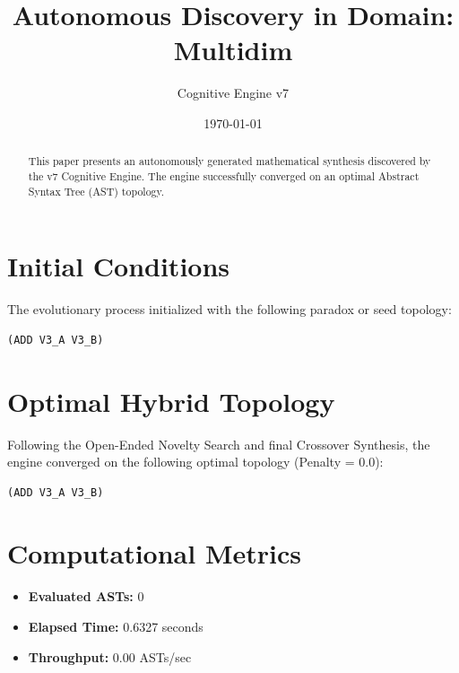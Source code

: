 \documentclass{article}
\title{Autonomous Discovery in Domain: Multidim}
\author{Cognitive Engine v7}
\date{\today}
\begin{document}
\maketitle
\begin{abstract}
This paper presents an autonomously generated mathematical synthesis discovered by the v7 Cognitive Engine. The engine successfully converged on an optimal Abstract Syntax Tree (AST) topology.\end{abstract}
\section{Initial Conditions}
The evolutionary process initialized with the following paradox or seed topology:
\begin{verbatim}
(ADD V3_A V3_B)
\end{verbatim}
\section{Optimal Hybrid Topology}
Following the Open-Ended Novelty Search and final Crossover Synthesis, the engine converged on the following optimal topology (Penalty = 0.0):
\begin{verbatim}
(ADD V3_A V3_B)
\end{verbatim}
\section{Computational Metrics}
\begin{itemize}
  \item \textbf{Evaluated ASTs:} 0
  \item \textbf{Elapsed Time:} 0.6327 seconds
  \item \textbf{Throughput:} 0.00 ASTs/sec
\end{itemize}
\end{document}

